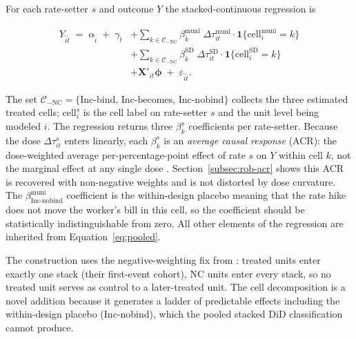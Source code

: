\documentclass[12pt]{article}
\begin{document}
For each rate-setter $s$ and outcome $Y$ the stacked-continuous
regression is

\begin{equation}
\begin{split}
Y_{\tilde{i}\tilde{t}} \;=\; \alpha_{\tilde{i}} \;+\; \gamma_{\tilde{t}}
&+ \sum_{k \in \mathcal{C}_{-\text{NC}}} \beta^{\text{muni}}_k \;\Delta\tau^{\text{muni}}_{it} \cdot \mathbf{1}\{\text{cell}^{\text{muni}}_i = k\} \\
&+ \sum_{k \in \mathcal{C}_{-\text{NC}}} \beta^{\text{SD}}_k  \;\Delta\tau^{\text{SD}}_{it}   \cdot \mathbf{1}\{\text{cell}^{\text{SD}}_i = k\}   \\
&+ \mathbf{X}'_{it}\boldsymbol{\phi}
\;+\; \varepsilon_{\tilde{i}\tilde{t}}.
\end{split}
\label{eq:headline}
\end{equation}

The set
$\mathcal{C}_{-\text{NC}} = \{\text{Inc-bind, Inc-becomes, Inc-nobind}\}$
collects the three estimated treated cells; $\text{cell}^s_i$ is the cell label
on rate-setter $s$ and the unit level being modeled $i$. The regression returns three $\beta^s_k$
coefficients per rate-setter. Because the dose $\Delta\tau^s_{it}$ enters
linearly, each $\beta^s_k$ is an \emph{average causal response} (ACR): the
dose-weighted average per-percentage-point effect of rate $s$ on $Y$ within
cell $k$, not the marginal effect at any single dose
\citep{bakerDifferenceinDifferencesDesignsPractitioners2025,dechaisemartin2024}.
Section~\ref{subsec:rob-acr} shows this ACR is recovered with non-negative
weights and is not distorted by dose curvature. The
$\beta^{\text{muni}}_{\text{Inc-nobind}}$ coefficient is the
within-design placebo meaning that the rate hike
does not move the worker's bill in this cell, so the coefficient
should be statistically indistinguishable from zero. All other
elements of the regression are inherited from
Equation~\ref{eq:pooled}.

The construction uses the negative-weighting fix from
\citet{bakerDifferenceinDifferencesDesignsPractitioners2025}:
treated units enter exactly one stack (their first-event cohort),
NC units enter every stack, so no treated unit serves as control
to a later-treated unit. The cell decomposition is a
novel addition because it generates a ladder of predictable effects including the within-design placebo
(Inc-nobind), which the pooled stacked DiD
classification cannot produce.
\end{document}
